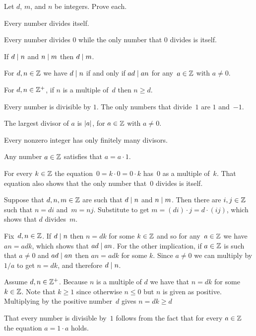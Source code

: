 \documentclass{ibl}  %
\begin{document}
\begin{ex} \label{ex:DivisibilityProperties}
Let $d$, $m$, and $n$ be integers.
Prove each.
\begin{exes}
\item {} Every number divides itself.
\item Every number divides $0$ while
  the only number that $0$ divides is itself.
\item {} If $d\mid n$ and $n\mid m$ 
   then $d\mid m$.
\item {} 
  For $d,n\in\mathbb{Z}$ we have $d\mid n$ if and only if 
  $ad\mid an$ for any~$a\in\mathbb{Z}$ with $a\neq 0$.
\item {} 
  For $d,n\in\mathbb{Z}^+$, if $n$ is a multiple of~$d$ then $n\geq d$.
\item Every number is divisible by $1$.
  The only numbers that divide~$1$ are $1$ and~$-1$.
\item The largest divisor of $a$ is $\lvert a\rvert$, for $a\in\mathbb{Z}$ with $a\neq 0$.
\item Every nonzero integer has only finitely many divisors.
\end{exes}
\begin{ans}
\begin{exes}
\item Any number $a\in\mathbb{Z}$ satisfies that $a=a\cdot 1$.
\item For every $k\in\mathbb{Z}$ the equation~$0=k\cdot 0=0\cdot k$ has~$0$ 
  as a multiple of~$k$.
  That equation also shows that the only number that~$0$ divides is itself. 
\item Suppose that $d, n, m\in\mathbb{Z}$ are such that $d\mid n$ and
  $n\mid m$.
  Then there are $i,j\in\mathbb{Z}$ such that $n=di$ and~$m=nj$.
  Substitute to get $m=(di)\cdot j=d\cdot(ij)$, which shows that
  $d$ divides~$m$.
\item Fix~$d,n\in\mathbb{Z}$.
  If $d\mid n$ then $n=dk$ for some $k\in\mathbb{Z}$ and so for any~$a\in\mathbb{Z}$
  we have $an=adk$, which shows that $ad\mid an$.
  For the other implication, if $a\in\mathbb{Z}$ is such that $a\neq 0$ and
  $ad\mid an$ then $an=adk$ for some  $k$.
  Since $a\neq 0$ we can multiply by $1/a$ to get $n=dk$, and therefore
  $d\mid n$.
\item Assume $d,n\in\mathbb{Z}^+$.
  Because $n$ is a multiple of $d$ we have that $n=dk$ for some $k\in\mathbb{Z}$.
  Note that $k\geq 1$ since otherwise $n\leq 0$ but $n$ is given as positive.  
  Multiplying by the positive number~$d$ gives $n=dk\geq d$ 
\item That every number is divisible by~$1$ follows from the fact that
   for every $a\in\mathbb{Z}$ the equation $a=1\cdot a$ holds.


\end{exes}
\end{ans}
\end{ex}
\end{document}
